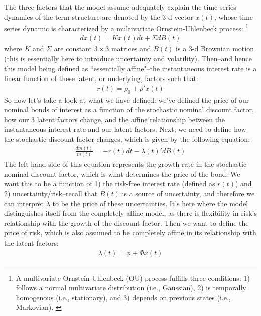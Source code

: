 \documentclass[12pt,final]{article}
\begin{document}
The three factors that the model assume adequately explain the time-series dynamics of the term structure are denoted by the 3-d vector $x(t)$, whose time-series dynamic is characterized by a multivariate Ornstein-Uhlenbeck process: \footnote{A multivariate Ornstein-Uhlenbeck (OU) process fulfills three conditions: 1) follows a normal multivariate distribution (i.e., Gaussian), 2) is temporally homogenous (i.e., stationary), and 3) depends on previous states (i.e., Markovian). \citep{Maller2009}}
\begin{gather}
	dx(t) = Kx(t)dt + \Sigma dB(t)
\end{gather}
where $K$ and $\Sigma$ are constant $3\times3$ matrices and $B(t)$ is a 3-d Brownian motion (this is essentially here to introduce uncertainty and volatility). Then--and hence this model being defined as ``essentially affine"--the instantaneous interest rate is a linear function of these latent, or underlying, factors such that:
\begin{gather}
	r(t) = \rho_0 + \rho'x(t)
\end{gather}
So now let's take a look at what we have defined: we've defined the price of our nominal bonds of interest as a function of the stochastic nominal discount factor, how our 3 latent factors change, and the affine relationship between the instantaneous interest rate and our latent factors. Next, we need to define how the stochastic discount factor changes, which is given by the following equation:
\begin{gather}
	\frac{dm(t)}{m(t)} = -r(t)dt - \lambda(t)'dB(t)
\end{gather}
The left-hand side of this equation represents the growth rate in the stochastic nominal discount factor, which is what determines the price of the bond. We want this to be a function of 1) the risk-free interest rate (defined as $r(t)$) and 2) uncertainty/risk--recall that $B(t)$ is a source of uncertainty, and therefore we can interpret $\lambda$ to be the price of these uncertainties. It's here where the model distinguishes itself from the completely affine model, as there is flexibility in risk's relationship with the growth of the discount factor. 
Then we want to define the price of risk, which is also assumed to be completely affine in its relationship with the latent factors: 
\begin{gather}
	\lambda(t) = \phi + \Phi x(t)
\end{gather}
\end{document}
